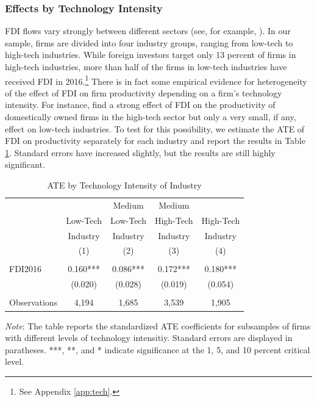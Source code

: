 \documentclass[a4paper,11pt]{scrartcl}
\begin{document}
\subsubsection*{Effects by Technology Intensity}

FDI flows vary strongly between different sectors (see, for example, \citet{Smarzynska2004, Keller2009, Haskel2007}). In our sample, firms are divided into four industry groups, ranging from low-tech to high-tech industries. While foreign investors target only 13 percent of firms in high-tech industries, more than half of the firms in low-tech industries have received FDI in 2016.\footnote{See Appendix \ref{app:tech}.} There is in fact some empirical evidence for heterogeneity of the effect of FDI on firm productivity depending on a firm's technology intensity. %
For instance, \citet{Keller2009} find a strong effect of FDI on the productivity of domestically owned firms in the high-tech sector but only a very small, if any, effect on low-tech industries. 
To test for this possibility, we estimate the ATE of FDI on productivity separately for each industry and report the results in Table \ref{tab:TECH}. Standard errors have increased slightly, but the results are still highly significant. 

\begin{table}[h!]
  \centering
   \caption{ATE by Technology Intensity of Industry}
   \label{tab:TECH}
\begin{threeparttable}
 
\begin{tabular}{lcccc}
 \hline
 \hline
 & & Medium & Medium &  \\ 
 & Low-Tech & Low-Tech & High-Tech & High-Tech \\ 
 & Industry & Industry & Industry & Industry \\ 
 & (1) & (2) & (3) & (4) \\
 \hline
 &  &  &  &  \\
FDI2016 & 0.160*** & 0.086*** & 0.172*** & 0.180*** \\
	      & (0.020) & (0.028) & (0.019) & (0.054) \\
	      &  &  &  &  \\
 Observations & 4,194 & 1,685 & 3,539 & 1,905 \\ 
	\hline
	\hline
\end{tabular}	

\begin{tablenotes}[flushleft]
     \footnotesize       
\item \textit{Note}: The table reports the standardized ATE coefficients for subsamples of firms with different levels of technology intensitiy. Standard errors are displayed in paratheses. ***, **, and * indicate significance at the 1, 5, and 10 percent critical level. 

\end{tablenotes}


\end{threeparttable}
\end{table}
\end{document}

